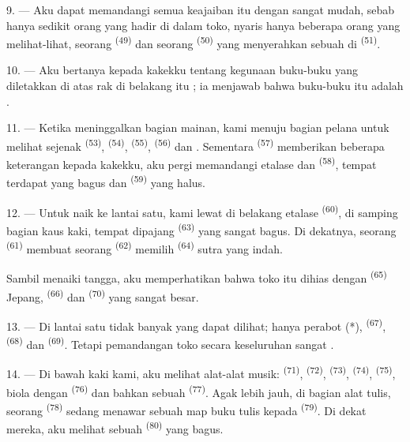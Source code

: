 9. --- Aku dapat memandangi semua keajaiban itu dengan sangat mudah,
sebab hanya sedikit orang yang hadir di dalam toko, nyaris hanya
beberapa orang yang melihat-lihat, seorang 
\textsuperscript{(49)} dan seorang 
\textsuperscript{(50)} yang menyerahkan sebuah  di
 \textsuperscript{(51)}.

10. --- Aku bertanya kepada kakekku tentang kegunaan buku-buku yang
diletakkan di atas rak di belakang  itu ; ia
menjawab bahwa buku-buku itu adalah .

\VUsaut{3.6mm}
\VUsaut{2.8mm}

11. --- Ketika meninggalkan bagian mainan, kami menuju bagian pelana
untuk melihat sejenak  \textsuperscript{(53)},
 \textsuperscript{(54)}, 
\textsuperscript{(55)},  \textsuperscript{(56)}
dan . Sementara 
\textsuperscript{(57)} memberikan beberapa keterangan kepada kakekku,
aku pergi memandangi etalase  dan 
\textsuperscript{(58)}, tempat terdapat  yang
bagus dan  \textsuperscript{(59)} yang halus.

12. --- Untuk naik ke lantai satu, kami lewat di belakang etalase
 \textsuperscript{(60)}, di samping bagian kaus kaki,
tempat dipajang  \textsuperscript{(63)} yang
sangat bagus. Di dekatnya, seorang 
\textsuperscript{(61)} membuat seorang 
\textsuperscript{(62)} memilih  \textsuperscript{(64)}
sutra yang indah.

Sambil menaiki tangga, aku memperhatikan bahwa toko itu dihias dengan
 \textsuperscript{(65)} Jepang, 
\textsuperscript{(66)} dan  \textsuperscript{(70)}
yang sangat besar.

13. --- Di lantai satu tidak banyak yang dapat dilihat; hanya perabot
(*),  \textsuperscript{(67)}, 
\textsuperscript{(68)} dan 
\textsuperscript{(69)}. Tetapi pemandangan toko secara keseluruhan
sangat .

14. --- Di bawah kaki kami, aku melihat alat-alat musik:
 \textsuperscript{(71)}, 
\textsuperscript{(72)},  \textsuperscript{(73)},
 \textsuperscript{(74)}, 
\textsuperscript{(75)}, biola dengan 
\textsuperscript{(76)} dan bahkan sebuah 
\textsuperscript{(77)}. Agak lebih jauh, di bagian alat tulis, seorang
 \textsuperscript{(78)} sedang menawar sebuah map
buku tulis kepada  \textsuperscript{(79)}. Di dekat
mereka, aku melihat sebuah  \textsuperscript{(80)}
yang bagus.

